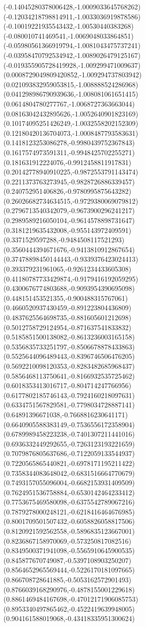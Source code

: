 {(-0.14045280378006428,-1.0009033645768262)
(-0.12034218798814911,-1.0033036919878586)
(-0.10019221935543432,-1.00530440383268)
(-0.080010741469541,-1.0069048033864851)
(-0.05980561366919794,-1.0081043475737241)
(-0.03958470792534942,-1.0089026479125167)
(-0.019355905728419928,-1.009299471009637)
(0.0008729049809420852,-1.009294737803942)
(0.021093832959053815,-1.008888524286968)
(0.041298986790939636,-1.008081061651415)
(0.0614804780277767,-1.0068727363663044)
(0.08163042432895626,-1.0052640901823169)
(0.10174095251426249,-1.0032558202152309)
(0.12180420136704073,-1.0008487793583631)
(0.1418123253086278,-0.9980439752367843)
(0.1617574973591311,-0.9948425702255271)
(0.181631912224076,-0.9912458811917831)
(0.20142778940910225,-0.9872553791143474)
(0.2211373763273945,-0.9828726886339457)
(0.240752951406826,-0.9780995875643282)
(0.26026682734634515,-0.9729380069079812)
(0.2796713540342079,-0.9673900296241217)
(0.2989589216050104,-0.9614578898731647)
(0.3181219635432008,-0.955143972409591)
(0.3371529597288,-0.9484508117521293)
(0.3560444394671676,-0.9413810912867654)
(0.37478898450144443,-0.9339376423024413)
(0.393379231961065,-0.9261234433605308)
(0.41180787733429874,-0.9179416192059295)
(0.4300676774803688,-0.9093954390695098)
(0.448151453521355,-0.900488315767061)
(0.4660520937430459,-0.891223804436809)
(0.4837625564698735,-0.881605601212698)
(0.5012758729124954,-0.871637541833832)
(0.5185851500138082,-0.8613236003165158)
(0.5356835733251797,-0.8506678878433863)
(0.5525644096489443,-0.8396746506476205)
(0.5692210098120353,-0.8283482685968437)
(0.5856468113750641,-0.8166932535725462)
(0.6018353413016717,-0.804714247766956)
(0.6177802185746143,-0.7924160218097631)
(0.6334751567829581,-0.7798034728887141)
(0.64891396671038,-0.7668816230641171)
(0.6640905588383149,-0.7536556172358904)
(0.6789989458223238,-0.7401307211441016)
(0.6936332449292655,-0.7263123193221659)
(0.7079876805637686,-0.7122059133544937)
(0.7220565865440821,-0.6978171195211422)
(0.7358344083648042,-0.6831516664770679)
(0.7493157055096004,-0.6682153931409509)
(0.7624951536758884,-0.6530142464233412)
(0.7753675469580098,-0.6375542789067216)
(0.7879278000248121,-0.6218416464676985)
(0.8001709501507432,-0.6058826058817506)
(0.8120921592562558,-0.5896835123667001)
(0.8236867158970069,-0.573250817082516)
(0.8349500371941098,-0.5565910645900535)
(0.845877670749087,-0.5397108903250207)
(0.8564652965569444,-0.5226170181097665)
(0.866708728641885,-0.5053162572901493)
(0.8766039168290976,-0.4878155001229618)
(0.8861469484167698,-0.47012171906085753)
(0.8953340497865462,-0.4522419639948005)
(0.904161588019068,-0.43418335951300624)
}
